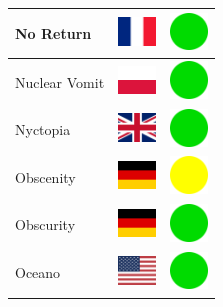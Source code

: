 \documentclass[12pt, a4paper, twoside]{report}
\begin{document}
\begin{center}
\begin{longtable}{|p{5cm}|p{2cm}|p{2cm}|}
 No Return                                                  & \includegraphics[width=1cm]{4x3/fr} &   \includegraphics[width=1cm]{likes/y} \\ \hline
 Nuclear Vomit                                              & \includegraphics[width=1cm]{4x3/pl} &   \includegraphics[width=1cm]{likes/y} \\ \hline
 Nyctopia                                                   & \includegraphics[width=1cm]{4x3/gb} &   \includegraphics[width=1cm]{likes/y} \\ \hline
 Obscenity                                                  & \includegraphics[width=1cm]{4x3/de} &   \includegraphics[width=1cm]{likes/m} \\ \hline
 Obscurity                                                  & \includegraphics[width=1cm]{4x3/de} &   \includegraphics[width=1cm]{likes/y} \\ \hline
 Oceano                                                     & \includegraphics[width=1cm]{4x3/us} &   \includegraphics[width=1cm]{likes/y} \\ \hline

\end{longtable}
\end{center}
\end{document}
